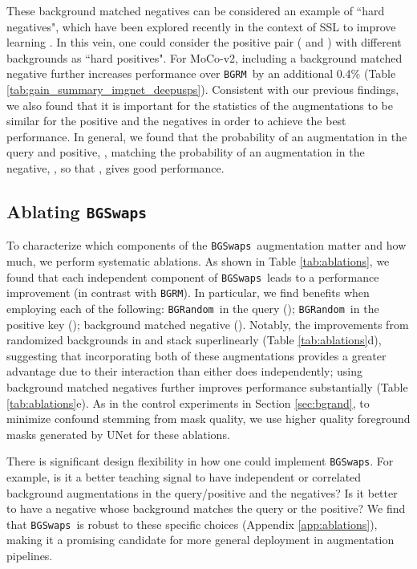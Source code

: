 \documentclass[twoside,11pt]{article}
\newcommand{\bgrm}{\texttt{BG\textunderscore RM}}
\newcommand{\bgswaps}{\texttt{BG\textunderscore Swaps}}
\newcommand{\bgrand}{\texttt{BG\textunderscore Random}}
\newcommand{\pneg}{}
\newcommand{\ppos}{}
\newcommand{\moco}{MoCo-v2}
\begin{document}
These background matched negatives can be considered an example of ``hard negatives", which have been explored recently in the context of SSL to improve learning \citep{kalantidis2020hard, wu2021conditional, robinson2021contrastive, cai_2020}. In this vein, one could consider the positive pair ( and ) with different backgrounds as ``hard positives". For \moco, including a background matched negative further increases performance over \bgrm~by an additional 0.4\% (Table \ref{tab:gain_summary_imgnet_deepusps}). Consistent with our previous findings, we also found that it is important for the statistics of the augmentations to be similar for the positive and the negatives in order to achieve the best performance. In general, we found that the probability of an augmentation in the query and positive, \ppos, matching the probability of an augmentation in the negative, \pneg, so that \ppos \pneg, gives good performance. 



\subsection{Ablating \bgswaps}
\label{sec:bgswap_ablations}

To characterize which components of the \bgswaps~augmentation matter and how much, we perform systematic ablations. As shown in Table \ref{tab:ablations}, we found that each independent component of \bgswaps~leads to a performance improvement (in contrast with \bgrm). In particular, we find benefits when employing each of the following: \bgrand~in the query (); \bgrand~in the positive key (); background matched negative (). Notably, the improvements from randomized backgrounds in  and  stack superlinearly (Table \ref{tab:ablations}d), suggesting that incorporating both of these augmentations provides a greater advantage due to their interaction than either does independently; using background matched negatives further improves performance substantially (Table \ref{tab:ablations}e). As in the control experiments in Section \ref{sec:bgrand}, to minimize confound stemming from mask quality, we use higher quality foreground masks generated by UNet for these ablations.

There is significant design flexibility in how one could implement \bgswaps. For example, is it a better teaching signal to have independent  or correlated background augmentations in the query/positive and the negatives? Is it better to have a negative whose background matches the query or the positive? We find that \bgswaps~is robust to these specific choices (Appendix \ref{app:ablations}), making it a promising candidate for more general deployment in augmentation pipelines.
\end{document}
